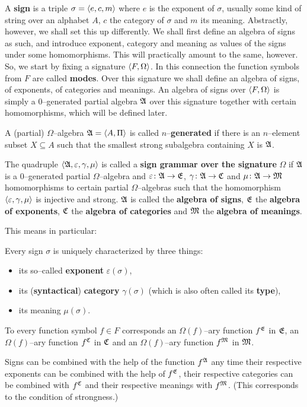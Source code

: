 A \textbf{sign} 
is a triple $\sigma = \langle e, c, m\rangle$
where $e$ is the exponent of $\sigma$, usually some kind of string
over an alphabet $A$, $c$ the category of $\sigma$ and $m$ its
meaning. Abstractly, however, we shall set this up differently.
We shall first define an algebra of signs as such, and introduce
exponent, category and meaning as values of the signs under some
homomorphisms. This will practically amount to the same, however.
So, we start by fixing a signature $\langle F, \Omega\rangle$. In this
connection the function symbols from $F$ are called \textbf{modes}.
Over this signature we shall define an algebra of signs, of
exponents, of categories and meanings. An algebra of signs over
$\langle F, \Omega\rangle$ is simply a 0--generated partial algebra
$\mathfrak{A}$ over this signature together with certain homomorphisms,
which will be defined later.
\begin{defn}
A (partial) $\Omega$--algebra $\mathfrak{A} = \langle A, \Pi\rangle$ is called
$n$--\textbf{generated} if there is an $n$--element subset $X
\subseteq A$ such that the smallest strong subalgebra containing
$X$ is $\mathfrak{A}$.
\end{defn}
\begin{defn}
The quadruple $\langle \mathfrak{A}, \varepsilon, \gamma, \mu\rangle$ 
\index{$\varepsilon$, $\gamma$, $\mu$}%
is called a \textbf{sign grammar over the  signature} $\Omega$
if $\mathfrak{A}$ is a 0--generated partial $\Omega$--algebra
and $\varepsilon \colon \mathfrak{A} \rightarrow \mathfrak{E}$, $\gamma \colon \mathfrak{A} \rightarrow \mathfrak{C}$
and $\mu \colon \mathfrak{A} \rightarrow \mathfrak{M}$ homomorphisms to certain partial
$\Omega$--algebras such that the homomorphism
$\langle \varepsilon, \gamma, \mu\rangle$ is injective and strong.
$\mathfrak{A}$ is called the \textbf{algebra of signs}, $\mathfrak{E}$ the
\textbf{algebra of exponents}, $\mathfrak{C}$ the \textbf{algebra of categories}
and $\mathfrak{M}$ the \textbf{algebra of meanings}.
\end{defn}
This means in particular:
\begin{dinglist}{43}
\item
Every sign $\sigma$ is uniquely characterized by three things:
\begin{itemize}
\item
its so--called \textbf{exponent} $\varepsilon(\sigma)$,
\item
its (\textbf{syntactical}) \textbf{category} $\gamma(\sigma)$ (which 
is also often called its \textbf{type}),
\item
its meaning $\mu(\sigma)$.
\end{itemize}
\item
To every function symbol $f \in F$ corresponds an
$\Omega(f)$--ary function $f^{\mathfrak{E}}$ in $\mathfrak{E}$, an 
$\Omega(f)$--ary function $f^{\mathfrak{C}}$ in $\mathfrak{C}$ and an 
$\Omega(f)$--ary function $f^{\mathfrak{M}}$ in $\mathfrak{M}$.
\item
Signs can be combined with the help of the function $f^{\mathfrak{A}}$
any time their respective exponents can be combined with the help
of $f^{\mathfrak{E}}$, their respective categories can be combined
with $f^{\mathfrak{C}}$ and their respective meanings with $f^{\mathfrak{M}}$.
(This corresponds to the condition of strongness.)
\end{dinglist}
